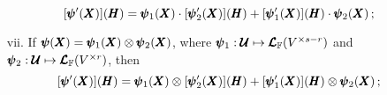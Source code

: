 \begin{itemize}
	\begin{equation}
	[\pmb{\psi}'(\pmb{X})](\pmb{H})=\pmb{\psi}_1(\pmb{X})\cdot[\pmb{\psi}_2'(\pmb{X})](\pmb{H}) + [\pmb{\psi}_1'(\pmb{X})](\pmb{H}) \cdot \pmb{\psi}_2(\pmb{X})\,;
	\end{equation}
	\item[vii.] If $\pmb{\psi}(\pmb{X})=\pmb{\psi}_1(\pmb{X})\otimes\pmb{\psi}_2(\pmb{X})$, where $\pmb{\psi}_1 : \pmb{\mathcal{U}} \mapsto \pmb{\mathcal{L}}_{\mathbb{F}}(V^{\times s-r})$ and $\pmb{\psi}_2 : \pmb{\mathcal{U}} \mapsto \pmb{\mathcal{L}}_{\mathbb{F}}(V^{\times r})$, then
\begin{equation}
[\pmb{\psi}'(\pmb{X})](\pmb{H})=\pmb{\psi}_1(\pmb{X})\otimes[\pmb{\psi}_2'(\pmb{X})](\pmb{H}) + [\pmb{\psi}_1'(\pmb{X})](\pmb{H}) \otimes \pmb{\psi}_2(\pmb{X})\,;
\end{equation}
\end{itemize}


